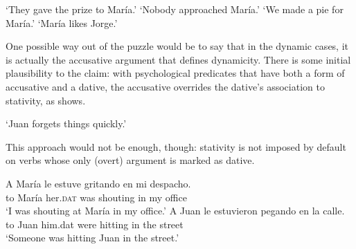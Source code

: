 \documentclass[output=paper,colorlinks,citecolor=brown,nonflat]{langsci/langscibook}
\begin{document}
\ea%
    \label{ex:fabregas:10}
    \glt `They gave the prize to María.'
    \glt `Nobody approached María.'
    \glt `We made a pie for María.'
    \glt `María likes Jorge.'
    \z
\z

One possible way out of the puzzle would be to say that in the dynamic cases, it is actually the accusative argument that defines dynamicity. There is some initial plausibility to the claim: with psychological predicates that have both a form of accusative and a dative, the accusative overrides the dative's association to stativity, as  shows. 

    \glt `Juan forgets things quickly.'
    \z

This approach would not be enough, though: stativity is not imposed by default on verbs whose only (overt) argument \citep{Pineda2016, Pineda2019} is marked as dative.

\ea%
    \label{ex:fabregas:12}
    \ea\label{ex:fabregas:12a}
    \gll    A María le       estuve   gritando en mi despacho.\\
            {to} {María} {her.}\textsc{dat}   {was}      {shouting} {in} {my} {office}\\
    \glt `I was shouting at María in my office.'
    \ex\label{ex:fabregas:12b}
    \gll    A Juan le       estuvieron   pegando en la calle.\\
            {to} {Juan} {him.dat}   {were}          {hitting}    {in} {the} {street}\\
    \glt `Someone was hitting Juan in the street.'
    \z
\z
\end{document}
